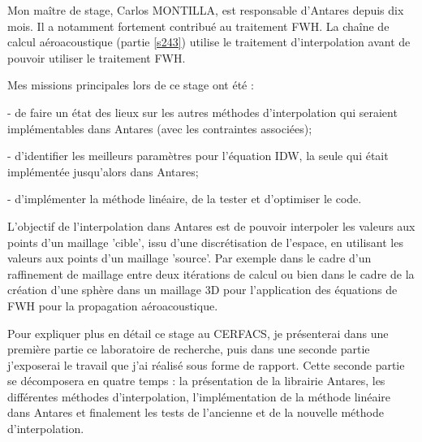 Mon maître de stage, Carlos MONTILLA, est responsable d'Antares depuis dix mois. Il a notamment fortement contribué au traitement \ac{FWH}. La chaîne de calcul aéroacoustique (partie \ref{s243}) utilise le traitement d'interpolation avant de pouvoir utiliser le traitement FWH.

Mes missions principales lors de ce stage ont été :

- de faire un état des lieux sur les autres méthodes d'interpolation qui seraient 
implémentables dans Antares (avec les contraintes associées);

- d'identifier les meilleurs paramètres pour l'équation \ac{IDW}, la seule qui était implémentée jusqu'alors dans Antares; %

- d'implémenter la méthode linéaire, de la tester et d'optimiser le code.  %

L'objectif de l'interpolation dans Antares est de pouvoir interpoler les valeurs aux points d'un maillage 'cible', issu d'une discrétisation de l'espace, en utilisant les valeurs aux points d'un maillage 'source'.
Par exemple dans le cadre d'un raffinement de maillage entre deux itérations de calcul ou bien dans le cadre de la création d'une sphère dans un maillage 3D pour l'application des équations de FWH pour la propagation aéroacoustique.

Pour expliquer plus en détail ce stage au CERFACS, je présenterai dans une première partie ce laboratoire de recherche, puis dans une seconde partie j'exposerai le travail que j'ai réalisé sous forme de rapport. Cette seconde partie se décomposera en quatre temps : la présentation de la librairie Antares, les différentes méthodes d'interpolation, l'implémentation de la méthode linéaire dans Antares et finalement les tests de l'ancienne et de la nouvelle méthode d'interpolation.